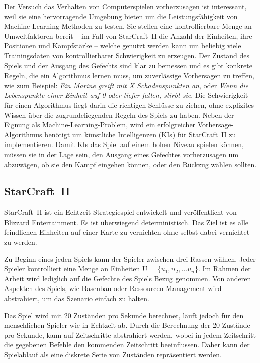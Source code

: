 Der Versuch das Verhalten von Computerspielen vorherzusagen ist interessant, weil sie eine hervorragende Umgebung bieten um die Leistungsfähigkeit von Machine-Learning-Methoden zu testen. Sie stellen eine kontrollierbare Menge an Umweltfaktoren bereit -- im Fall von StarCraft~II die Anzahl der Einheiten, ihre Positionen und Kampfstärke -- welche genutzt werden kann um beliebig viele Trainingsdaten von kontrollierbarer Schwierigkeit zu erzeugen. Der Zustand des Spiels und der Ausgang des Gefechts sind klar zu bemessen und es gibt konkrete Regeln, die ein Algorithmus lernen muss, um zuverlässige Vorhersagen zu treffen, wie zum Beispiel: \textit{Ein Marine greift mit X Schadenspunkten an}, oder \textit{Wenn die Lebenspunkte einer Einheit auf 0 oder tiefer fallen, stirbt sie}. Die Schwierigkeit für einen Algorithmus liegt darin die richtigen Schlüsse zu ziehen, ohne explizites Wissen über die zugrundeliegenden Regeln des Spiels zu haben. Neben der Eignung als Machine-Learning-Problem, wird ein erfolgreicher Vorhersage-Algorithmus benötigt um künstliche Intelligenzen (KIs) für StarCraft~II zu implementieren. Damit KIs das Spiel auf einem hohen Niveau spielen können, müssen sie in der Lage sein, den Ausgang eines Gefechtes vorherzusagen um abzuwägen, ob sie den Kampf eingehen können, oder den Rückzug wählen sollten. 

\subsection{StarCraft~II}
\label{SC2}

StarCraft~II ist ein Echtzeit-Strategiespiel entwickelt und veröffentlicht von Blizzard Entertainment. Es ist überwiegend deterministisch\footnotemark. Das Ziel ist es alle feindlichen Einheiten auf einer Karte zu vernichten ohne selbst dabei vernichtet zu werden.  

Zu Beginn eines jeden Spiels kann der Spieler zwischen drei Rassen wählen. Jeder Spieler kontrolliert eine Menge an Einheiten U = \{$u_1, u_2, ... u_n$\}. Im Rahmen der Arbeit wird lediglich auf die Gefechte des Spiels Bezug genommen. Von anderen Aspekten des Spiels, wie Basenbau oder Ressourcen-Management wird abstrahiert, um das Szenario einfach zu halten.

Das Spiel wird mit 20 Zuständen pro Sekunde berechnet, läuft jedoch für den menschlichen Spieler wie in Echtzeit ab. Durch die Berechnung der 20 Zustände pro Sekunde, kann auf Zeitschritte abstrahiert werden, wobei in jedem Zeitschritt die gegebenen Befehle den kommenden Zeitschritt beeinflussen. Daher kann der Spielablauf als eine diskrete Serie von Zuständen repräsentiert werden.

